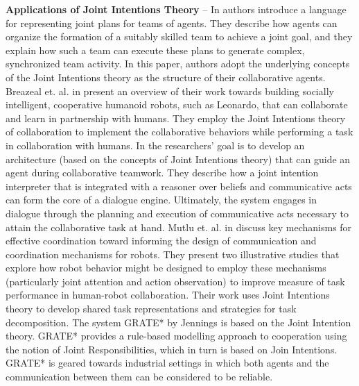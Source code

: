 \documentclass[12pt]{report}
\begin{document}
\textbf{Applications of Joint Intentions Theory} -- In \cite{kinny:planned-team}
authors introduce a language for representing joint plans for teams of agents.
They describe how agents can organize the formation of a suitably skilled team
to achieve a joint goal, and they explain how such a team can execute these
plans to generate complex, synchronized team activity. In this paper, authors
adopt the underlying concepts of the Joint Intentions theory as the structure of
their collaborative agents. Breazeal et. al. in \cite{breazeal:humanoid-robots}
present an overview of their work towards building socially intelligent,
cooperative humanoid robots, such as Leonardo, that can collaborate and learn in
partnership with humans. They employ the Joint Intentions theory of
collaboration to implement the collaborative behaviors while performing a task
in collaboration with humans. In \cite{subramanian:joint-intention-dialogue}
the researchers' goal is to develop an architecture (based on the concepts of
Joint Intentions theory) that can guide an agent during collaborative teamwork.
They describe how a joint intention interpreter that is integrated with a
reasoner over beliefs and communicative acts can form the core of a dialogue
engine. Ultimately, the system engages in dialogue through the planning and
execution of communicative acts necessary to attain the collaborative task at
hand. Mutlu et. al. in \cite{mutlu:coordination-robot} discuss key mechanisms
for effective coordination toward informing the design of communication and
coordination mechanisms for robots. They present two illustrative studies that
explore how robot behavior might be designed to employ these mechanisms
(particularly joint attention and action observation) to improve measure of task
performance in human-robot collaboration. Their work uses Joint Intentions
theory to develop shared task representations and strategies for task
decomposition. The system GRATE* by Jennings
\cite{jennings:joint-intention-hybrid} is based on the Joint Intention theory.
GRATE* provides a rule-based modelling approach to cooperation using the notion
of Joint Responsibilities, which in turn is based on Join Intentions. GRATE* is
geared towards industrial settings in which both agents and the communication
between them can be considered to be reliable.\\
\end{document}
